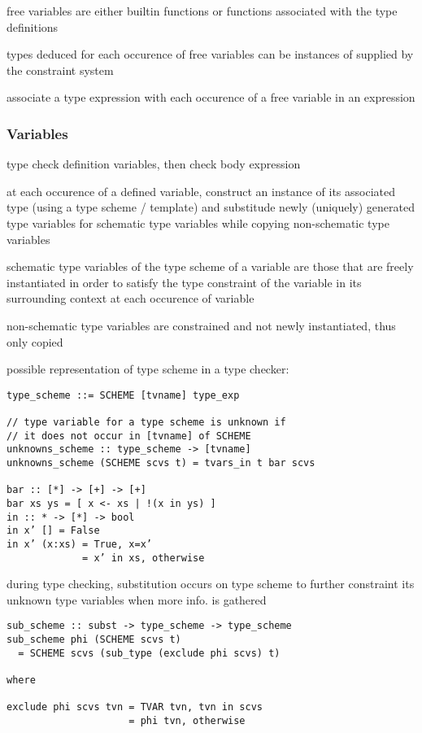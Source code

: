 \documentclass[8pt]{extarticle}
\begin{document}
\begin{multicols*}{2}
free variables are either builtin functions or functions associated with the type definitions

types deduced for each occurence of free variables can be instances of supplied by the constraint system

associate a type expression with each occurence of a free variable in an expression

\subsubsection{Variables}
type check definition variables, then check body expression

at each occurence of a defined variable, construct an instance of its associated type (using a type scheme / template) and substitude newly (uniquely) generated type variables for schematic type variables while copying non-schematic type variables

schematic type variables of the type scheme of a variable are those that are freely instantiated in order to satisfy the type constraint of the variable in its surrounding context at each occurence of variable

non-schematic type variables are constrained and not newly instantiated, thus only copied

possible representation of type scheme in a type checker:
\begin{verbatim}
type_scheme ::= SCHEME [tvname] type_exp

// type variable for a type scheme is unknown if
// it does not occur in [tvname] of SCHEME
unknowns_scheme :: type_scheme -> [tvname]
unknowns_scheme (SCHEME scvs t) = tvars_in t bar scvs

bar :: [*] -> [+] -> [+]
bar xs ys = [ x <- xs | !(x in ys) ]
in :: * -> [*] -> bool
in x’ [] = False
in x’ (x:xs) = True, x=x’
             = x’ in xs, otherwise
\end{verbatim}

during type checking, substitution occurs on type scheme to further constraint its unknown type variables when more info. is gathered

\begin{verbatim}
sub_scheme :: subst -> type_scheme -> type_scheme
sub_scheme phi (SCHEME scvs t)
  = SCHEME scvs (sub_type (exclude phi scvs) t)

where

exclude phi scvs tvn = TVAR tvn, tvn in scvs
                     = phi tvn, otherwise
\end{verbatim}


\end{multicols*}
\end{document}
